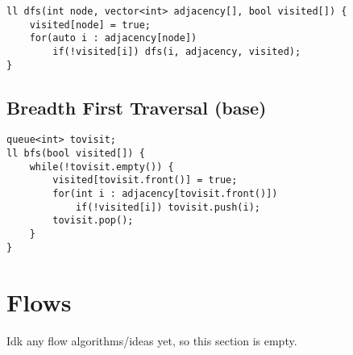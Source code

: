 \documentclass{article}
\begin{document}
        \begin{lstlisting}
ll dfs(int node, vector<int> adjacency[], bool visited[]) {
    visited[node] = true;
    for(auto i : adjacency[node])
        if(!visited[i]) dfs(i, adjacency, visited);
}       \end{lstlisting}


        \subsection{Breadth First Traversal (base)}


        \begin{lstlisting}
queue<int> tovisit;
ll bfs(bool visited[]) {
    while(!tovisit.empty()) {
        visited[tovisit.front()] = true;
        for(int i : adjacency[tovisit.front()])
            if(!visited[i]) tovisit.push(i);
        tovisit.pop();
    }
}       \end{lstlisting}

    \section{Flows}
    Idk any flow algorithms/ideas yet, so this section is empty.
\end{document}
